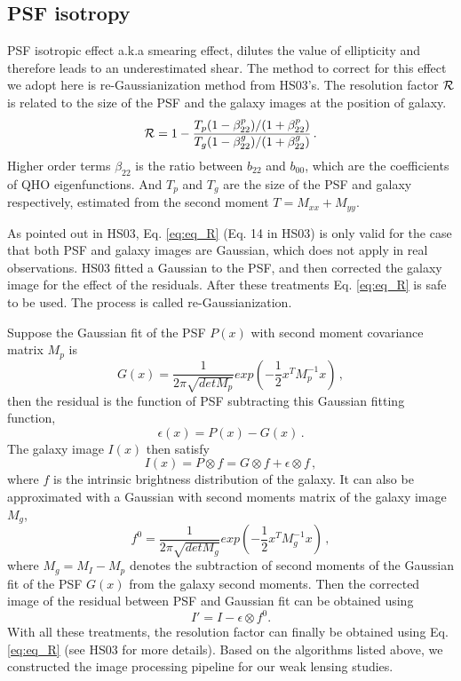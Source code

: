 \documentclass[apj]{emulateapj}
\begin{document}
\subsection{PSF isotropy}

PSF isotropic effect a.k.a smearing effect, dilutes the value of
ellipticity and therefore leads to an underestimated shear. The method
to correct for this effect we adopt here is re-Gaussianization method
from HS03's. The resolution factor ${\cal R}$ is related to the size
of the PSF and the galaxy images at the position of galaxy.
\begin{equation}
{\cal R}=1-\frac{T_p(1-\beta_{22}^p)/(1+\beta_{22}^p)}{T_g(1-\beta_{22}^g)/(1+\beta_{22}^g)}\,.
\label{eq:eq_R}
\end{equation}
Higher order terms $\beta_{22}$ is the ratio between $b_{22}$ and
$b_{00}$, which are the coefficients of QHO eigenfunctions.  And $T_p$
and $T_g$ are the size of the PSF and galaxy respectively, estimated
from the second moment $T=M_{xx}+M_{yy}$. 

As pointed out in HS03, Eq. \ref{eq:eq_R} (Eq. 14 in HS03) is only
valid for the case that both PSF and galaxy images are Gaussian, which
does not apply in real observations.  HS03 fitted a Gaussian to the
PSF, and then corrected the galaxy image for the effect of the
residuals. After these treatments Eq. \ref{eq:eq_R} is safe to be
used. The process is called re-Gaussianization.

Suppose the Gaussian fit of the PSF $P(x)$ with second moment
covariance matrix $M_p$ is
\begin{equation}
G(x)=\frac{1}{2\pi\sqrt{detM_p}}exp(-\frac{1}{2}x^TM_p^{-1}x)\,,
\end{equation}
then the residual is the function of PSF subtracting this Gaussian
fitting function,
\begin{equation}
\epsilon(x)=P(x)-G(x)\,.
\end{equation}
The galaxy image $I(x)$ then satisfy
\begin{equation}
I(x)=P\otimes f=G\otimes f+\epsilon\otimes f\,,
\end{equation}
where $f$ is the intrinsic brightness distribution of the galaxy. It
can also be approximated with a Gaussian with second moments matrix of the
galaxy image $M_g$,
\begin{equation}
f^0=\frac{1}{2\pi\sqrt{detM_g}}exp(-\frac{1}{2}x^TM_g^{-1}x)\,,
\end{equation}
where $M_g=M_I-M_p$ denotes the subtraction of second moments of the
Gaussian fit of the PSF $G(x)$ from the galaxy second moments. Then
the corrected image of the residual between PSF and Gaussian fit can
be obtained using
\begin{equation}
I'=I-\epsilon\otimes f^0.
\end{equation}
With all these treatments, the resolution factor can finally be
obtained using Eq. \ref{eq:eq_R} (see HS03 for more details). Based on
the algorithms listed above, we constructed the image processing
pipeline for our weak lensing studies.
\end{document}
